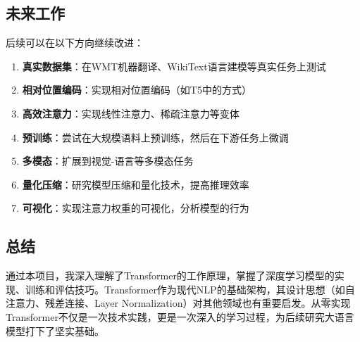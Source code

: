\documentclass[UTF8,12pt,a4paper]{ctexart}
\begin{document}
\subsection{未来工作}

后续可以在以下方向继续改进：

\begin{enumerate}
    \item \textbf{真实数据集}：在WMT机器翻译、WikiText语言建模等真实任务上测试
    \item \textbf{相对位置编码}：实现相对位置编码（如T5中的方式）
    \item \textbf{高效注意力}：实现线性注意力、稀疏注意力等变体
    \item \textbf{预训练}：尝试在大规模语料上预训练，然后在下游任务上微调
    \item \textbf{多模态}：扩展到视觉-语言等多模态任务
    \item \textbf{量化压缩}：研究模型压缩和量化技术，提高推理效率
    \item \textbf{可视化}：实现注意力权重的可视化，分析模型的行为
\end{enumerate}

\subsection{总结}

通过本项目，我深入理解了Transformer的工作原理，掌握了深度学习模型的实现、训练和评估技巧。Transformer作为现代NLP的基础架构，其设计思想（如自注意力、残差连接、Layer Normalization）对其他领域也有重要启发。从零实现Transformer不仅是一次技术实践，更是一次深入的学习过程，为后续研究大语言模型打下了坚实基础。
\end{document}
